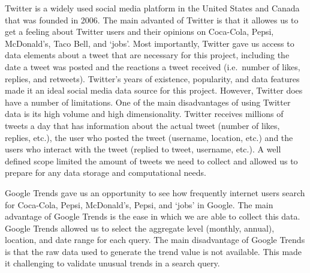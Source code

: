 \documentclass[12pt,oneside]{chicagocapstone}
\begin{document}
Twitter is a widely used social media platform in the United States and Canada that was founded in 2006. The main advanted of Twitter is that it allowes us to get a feeling about Twitter users and their opinions on Coca-Cola, Pepsi, McDonald's, Taco Bell, and `jobs'. Most importantly, Twitter gave us access to data elements about a tweet that are necessary for this project, including the date a tweet was posted and the reactions a tweet received (i.e.~number of likes, replies, and retweets). Twitter's years of existence, popularity, and data features made it an ideal social media data source for this project. However, Twitter does have a number of limitations. One of the main disadvantages of using Twitter data is its high volume and high dimensionality. Twitter receives millions of tweets a day that has information about the actual tweet (number of likes, replies, etc.), the user who posted the tweet (username, location, etc.) and the users who interact with the tweet (replied to tweet, username, etc.). A well defined scope limited the amount of tweets we need to collect and allowed us to prepare for any data storage and computational needs.

Google Trends gave us an opportunity to see how frequently internet users search for Coca-Cola, Pepsi, McDonald's, Pepsi, and `jobs' in Google. The main advantage of Google Trends is the ease in which we are able to collect this data. Google Trends allowed us to select the aggregate level (monthly, annual), location, and date range for each query. The main disadvantage of Google Trends is that the raw data used to generate the trend value is not available. This made it challenging to validate unusual trends in a search query.
\end{document}
